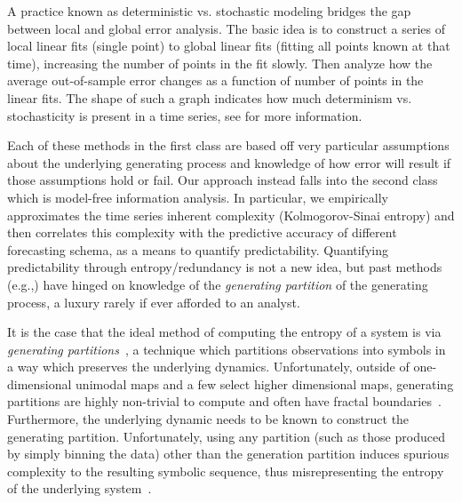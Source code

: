 A practice known as deterministic vs. stochastic modeling\cite{Casdagli92dvsplots, weigend-book} bridges the gap between local and global error analysis. The basic idea is to construct a series of local linear fits (single point) to global linear fits (fitting all points known at that time), increasing the number of points in the fit slowly. Then analyze how the average out-of-sample error changes as a function of number of points in the linear fits. The shape of such a graph indicates how much determinism vs. stochasticity is present in a time series, see  \cite{Casdagli92dvsplots, weigend-book} for more information. 

Each of these methods in the first class are based off very particular assumptions about the underlying generating process and knowledge of how error will result if those assumptions hold or fail. Our approach instead falls into the second class which is model-free information analysis. In particular, we empirically approximates the time series inherent complexity (Kolmogorov-Sinai entropy) and then correlates this complexity with the predictive accuracy of different forecasting schema, as a means to quantify predictability. Quantifying predictability through entropy/redundancy is not a new idea, but past methods (e.g.,\cite{Shannon1951, mantegna1994linguistic}) have hinged on knowledge of the \emph{generating partition} of the generating process, a luxury rarely if ever afforded to an analyst. 
 
It is the case that the ideal method of computing the entropy of a system is via \emph{generating partitions}~\cite{lind95}, a technique which partitions observations into symbols in a way which preserves the underlying dynamics. Unfortunately, outside of one-dimensional unimodal maps and a few select higher dimensional maps, generating partitions are highly non-trivial to compute and often have fractal boundaries~\cite{eisele1999}. Furthermore, the underlying dynamic needs to be known to construct the generating partition. Unfortunately, using any partition (such as those produced by simply binning the data) other than the generation partition induces spurious complexity to the resulting symbolic sequence, thus misrepresenting the entropy of the underlying system~\cite{bollt2001}.


